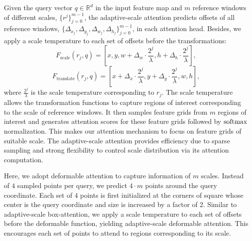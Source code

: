 \begin{enumerate}[leftmargin=*,itemsep=0pt,topsep=0pt]
    Given the query vector $q \in \mathbb{R}^d$ in the input feature map and $m$ reference windows of different scales, $\{r^j\}_{j=0}^{m-1}$, the adaptive-scale attention predicts offsets of all reference windows, $\{\Delta_{x_j},\Delta_{y_j},\Delta_{w_j},\Delta_{h_j}\}_{j=0}^{m-1}$, in each attention head. Besides, we apply a scale temperature to each set of offsets before the transformations:
    \begin{equation}
        F_\text{scale}(r_j, q) = [x, y, w + \Delta_w\cdot\frac{2^j}{\lambda}, h + \Delta_h\cdot\frac{2^j}{\lambda}], 
    \end{equation}
    \begin{equation}
        F_\text{translate}(r_j, q) = [x + \Delta_x\cdot\frac{2^j}{\lambda}, y + \Delta_y\cdot\frac{2^j}{\lambda}, w, h],
    \end{equation}
    where $\frac{2^j}{\lambda}$ is the scale temperature corresponding to $r_j$. The scale temperature allows the transformation functions to capture regions of interest corresponding to the scale of reference windows. It then samples feature grids from $m$ regions of interest and generates attention scores for these feature grids followed by $\mathrm{softmax}$ normalization. This makes our attention mechanism to focus on feature grids of suitable scale. The adaptive-scale attention provides efficiency due to sparse sampling and strong flexibility to control scale distribution via its attention computation.
\end{enumerate}

 Here, we adopt deformable attention to capture information of $m$ scales. Instead of $4$ sampled points per query, we predict $4\cdot m$ points around the query coordinate. Each set of $4$ points is first initialized at the corners of square whose center is the query coordinate and size is increased by a factor of 2. Similar to adaptive-scale box-attention, we apply a scale temperature to each set of offsets before the deformable function, yielding adaptive-scale deformable attention. This encourages each set of points to attend to regions corresponding to its scale.

